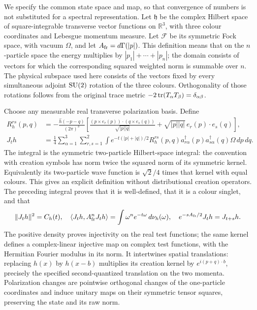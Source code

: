 We specify the common state space and map, so that convergence of
numbers is not substituted for a spectral representation. Let
$\mathfrak h$ be the complex Hilbert space of square-integrable
transverse vector functions on $\mathbb R^3$, with three colour
coordinates and Lebesgue momentum measure. Let $\mathcal F$ be
its symmetric Fock space, with vacuum $\Omega$, and let
$A_{\rm fr}=d\Gamma(|p|)$. This definition means that on the
$n$-particle space the energy multiplies by
$|p_1|+\cdots+|p_n|$; the domain consists of vectors for which
the corresponding squared weighted norm is summable over $n$.
The physical subspace used here consists of the vectors fixed by
every simultaneous adjoint $\operatorname{SU}(2)$ rotation of the three colours.
Orthogonality
of those rotations follows from the original trace metric
$-2\operatorname{tr}(T_\alpha T_\beta)=\delta_{\alpha\beta}$.

Choose any measurable real transverse polarization basis. Define
\begin{align}
 R_h^{rs}(p,q)&=-\frac{\widehat h(-p-q)}{(2\pi)^3}
 \left[\frac{(p\times e_r(p))\cdot(q\times e_s(q))}{\sqrt{|p||q|}}
       +\sqrt{|p||q|}\,e_r(p)\cdot e_s(q)\right],\nonumber\\
 J_t h&=\frac14\sum_{\alpha=1}^3\sum_{r,s=1}^2
 \int e^{-t(|p|+|q|)/2}R_h^{rs}(p,q)
    a^\dagger_{r\alpha}(p)a^\dagger_{s\alpha}(q)\Omega\,dp\,dq.
 \label{eq:full-state-map}
\end{align}
The integral is the symmetric two-particle Hilbert-space integral:
the convention with creation symbols has norm twice the squared
norm of its symmetric kernel. Equivalently its two-particle wave
function is $\sqrt2/4$ times that kernel with equal colours.
This gives an explicit definition without distributional creation
operators. The preceding integral proves that it is well-defined,
that it is a colour singlet, and that
\[
 \|J_t h\|^2=C_h(t),\quad
 \langle J_t h,A_{\rm fr}^nJ_t h\rangle
       =\int\omega^n e^{-t\omega}\,d\nu_h(\omega),\quad
 e^{-sA_{\rm fr}/2}J_t h=J_{t+s}h.
\]
The positive density proves injectivity on the real test functions;
the same kernel defines a complex-linear injective map on complex
test functions, with the Hermitian Fourier modulus in its norm.
It intertwines spatial translations: replacing $h(x)$ by $h(x-b)$
multiplies its creation kernel by $e^{i(p+q)\cdot b}$, precisely
the specified second-quantized translation on the two momenta.
Polarization changes are pointwise orthogonal changes of the
one-particle coordinates and induce unitary maps on their symmetric
tensor squares, preserving the state and its raw norm.

